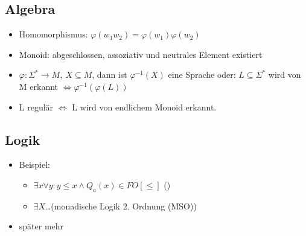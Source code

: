     \subsection{Algebra} %
    \label{sub:intro-algebra}
        \begin{itemize}
            \item Homomorphismus: $\varphi(w_1w_2)=\varphi(w_1)\varphi(w_2)$
            \item Monoid: abgeschlossen, assoziativ und neutrales Element existiert
            \item $\varphi : \Sigma^* \rightarrow M,\ X\subseteq M$, dann ist $\varphi^{-1}(X)$ eine Sprache
            \subitem oder: $L\subseteq \Sigma^*$ wird von M erkannt $\Leftrightarrow \varphi^{-1}\left(\varphi\left(L\right)\right)$
            \item L regulär $\Leftrightarrow$ L wird von endlichem Monoid erkannt.
        \end{itemize}
    \subsection{Logik} %
    \label{sub:intro-logik}
        \begin{itemize}
            \item Beispiel:
            \begin{itemize}
                \item $\exists x\forall y: y\le x\wedge Q_a(x) \in FO[\le]$ ()
                \item $\exists X$\dots (monadische Logik 2. Ordnung (MSO))
            \end{itemize}
            \item später mehr
        \end{itemize}
